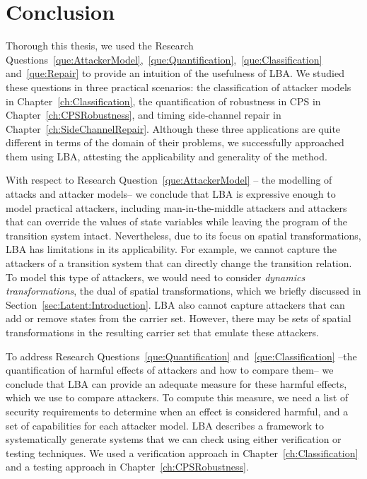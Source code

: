 \chapter{Conclusion}
Thorough this thesis, we used the Research Questions~\ref{que:AttackerModel},~\ref{que:Quantification},~\ref{que:Classification} and~\ref{que:Repair} to provide an intuition of the usefulness of LBA. We studied these questions in three practical scenarios: the classification of attacker models in Chapter~\ref{ch:Classification}, the quantification of robustness in CPS in Chapter~\ref{ch:CPSRobustness}, and timing side-channel repair in Chapter~\ref{ch:SideChannelRepair}. Although these three applications are quite different in terms of the domain of their problems, we successfully approached them using LBA, attesting the applicability and generality of the method. 

With respect to Research Question~\ref{que:AttackerModel} -- the modelling of attacks and attacker models-- we conclude that LBA is expressive enough to model practical attackers, including man-in-the-middle attackers and attackers that can override the values of state variables while leaving the program of the transition system intact. Nevertheless, due to its focus on spatial transformations, LBA has limitations in its applicability. For example, we cannot capture the attackers of a transition system that can directly change the transition relation. To model this type of attackers, we would need to consider \emph{dynamics transformations}, the dual of spatial transformations, which we briefly discussed in Section~\ref{sec:Latent:Introduction}. LBA also cannot capture attackers that can add or remove states from the carrier set. However, there may be sets of spatial transformations in the resulting carrier set that emulate these attackers. 

To address Research Questions~\ref{que:Quantification} and~\ref{que:Classification} --the quantification of harmful effects of attackers and how to compare them-- we conclude that LBA can provide an adequate measure for these harmful effects, which we use to compare attackers. To compute this measure, we need a list of security requirements to determine when an effect is considered harmful, and a set of capabilities for each attacker model. LBA describes a framework to systematically generate systems that we can check using either verification or testing techniques. We used a verification approach in Chapter~\ref{ch:Classification} and a testing approach in Chapter~\ref{ch:CPSRobustness}. 

